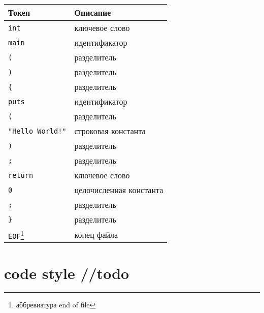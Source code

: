 \documentclass[myc.tex]{subfiles}
\begin{document}
\begin{small}
\begin{center}
\begin{tabular}{|l|l|}
\hline
\textbf{Токен} & \textbf{Описание}\\
\hline
\texttt{int} & ключевое слово\\
\texttt{main} & идентификатор\\
\texttt{(} & разделитель\\
\texttt{)} & разделитель\\
\texttt{\{} & разделитель\\
\texttt{puts} & идентификатор\\
\texttt{(} & разделитель\\
\texttt{"Hello World!"} & строковая константа\\
\texttt{)} & разделитель\\
\texttt{;} & разделитель\\
\texttt{return} & ключевое слово\\
\texttt{0} & целочисленная константа\\
\texttt{;} & разделитель\\
\texttt{\}} & разделитель\\
\texttt{EOF}\footnote{аббревиатура end of file} & конец файла\\
\hline
\end{tabular}
\end{center}
\end{small}







\section*{code style //todo}

%

\end{document}
